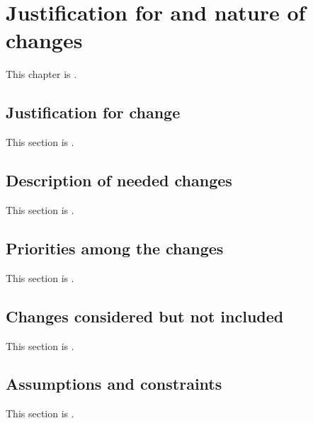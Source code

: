 
\chapter{Justification for and nature of changes}
\label{loc:Justification for and nature of changes}


This chapter is \TBD.


\section{Justification for change}
\label{loc:Justification for change}


This section is \TBD.


\section{Description of needed changes}
\label{loc:Description of needed changes}


This section is \TBD.


\section{Priorities among the changes}
\label{loc:Priorities among the changes}


This section is \TBD.


\section{Changes considered but not included}
\label{loc:Changes considered but not included}


This section is \TBD.


\section{Assumptions and constraints}
\label{loc:Assumptions and constraints}


This section is \TBD.
